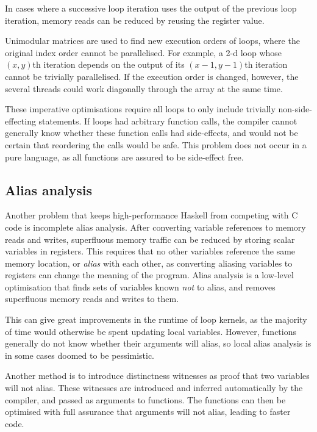 In cases where a successive loop iteration uses the output of the previous loop iteration, memory reads can be reduced by reusing the register value\cite{wang2013loop}.

Unimodular matrices are used to find new execution orders of loops, where the original index order cannot be parallelised\cite{banerjee1993loop}.
For example, a 2-d loop whose $(x,y)$th iteration depends on the output of its $(x-1,y-1)$th iteration cannot be trivially parallelised.
If the execution order is changed, however, the several threads could work diagonally through the array at the same time.

These imperative optimisations require all loops to only include trivially non-side-effecting statements.
If loops had arbitrary function calls, the compiler cannot generally know whether these function calls had side-effects,
and would not be certain that reordering the calls would be safe.
This problem does not occur in a pure language, as all functions are assured to be side-effect free.


\subsection{Alias analysis}

Another problem that keeps high-performance Haskell from competing with C code is incomplete alias analysis.
After converting variable references to memory reads and writes, superfluous memory traffic can be reduced by storing scalar variables in registers.
This requires that no other variables reference the same memory location, or \emph{alias} with each other,
as converting aliasing variables to registers can change the meaning of the program.
Alias analysis is a low-level optimisation that finds sets of variables known \emph{not} to alias, and removes superfluous memory reads and writes to them.

This can give great improvements in the runtime of loop kernels, as the majority of time would otherwise be spent updating local variables\cite{clifton2012optimisations}.
However, functions generally do not know whether their arguments will alias, so local alias analysis is in some cases doomed to be pessimistic.

Another method is to introduce distinctness witnesses\cite{ma2012type} as proof that two variables will not alias.
These witnesses are introduced and inferred automatically by the compiler, and passed as arguments to functions.
The functions can then be optimised with full assurance that arguments will not alias, leading to faster code.

